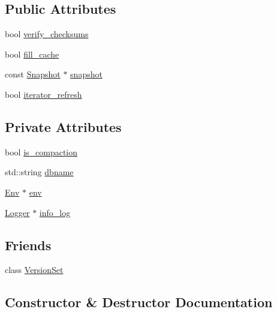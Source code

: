 \subsection*{Public Attributes}
\begin{DoxyCompactItemize}
\item 
bool \hyperlink{structleveldb_1_1_read_options_a43731d67b707995e20571ad33c1f53f2}{verify\+\_\+checksums}
\item 
bool \hyperlink{structleveldb_1_1_read_options_a49f3754f8838596148ed5cbf9bbf8664}{fill\+\_\+cache}
\item 
const \hyperlink{classleveldb_1_1_snapshot}{Snapshot} $\ast$ \hyperlink{structleveldb_1_1_read_options_a1fa3fffc267dff89fce7c39d7c7b5b50}{snapshot}
\item 
bool \hyperlink{structleveldb_1_1_read_options_a965fa3fa49e0b637a7925cf644c3d01f}{iterator\+\_\+refresh}
\end{DoxyCompactItemize}
\subsection*{Private Attributes}
\begin{DoxyCompactItemize}
\item 
bool \hyperlink{structleveldb_1_1_read_options_a7b49e4ea8d594b49ba3ae1a122f9ad66}{is\+\_\+compaction}
\item 
std\+::string \hyperlink{structleveldb_1_1_read_options_a97dd1e8864784d5bff4bb8cb82ec07cc}{dbname}
\item 
\hyperlink{classleveldb_1_1_env}{Env} $\ast$ \hyperlink{structleveldb_1_1_read_options_af4abfe04693f5813c8178c21bb20eca9}{env}
\item 
\hyperlink{classleveldb_1_1_logger}{Logger} $\ast$ \hyperlink{structleveldb_1_1_read_options_a8365a77bbd2f624c13b9af869cc6a3c2}{info\+\_\+log}
\end{DoxyCompactItemize}
\subsection*{Friends}
\begin{DoxyCompactItemize}
\item 
class \hyperlink{structleveldb_1_1_read_options_a1827cd1b4d6e9e3c378ce37ca3cce635}{Version\+Set}
\end{DoxyCompactItemize}


\subsection{Constructor \& Destructor Documentation}
\hypertarget{structleveldb_1_1_read_options_a6bf119f5a33b0d0a70fb60d8114351ef}{}
